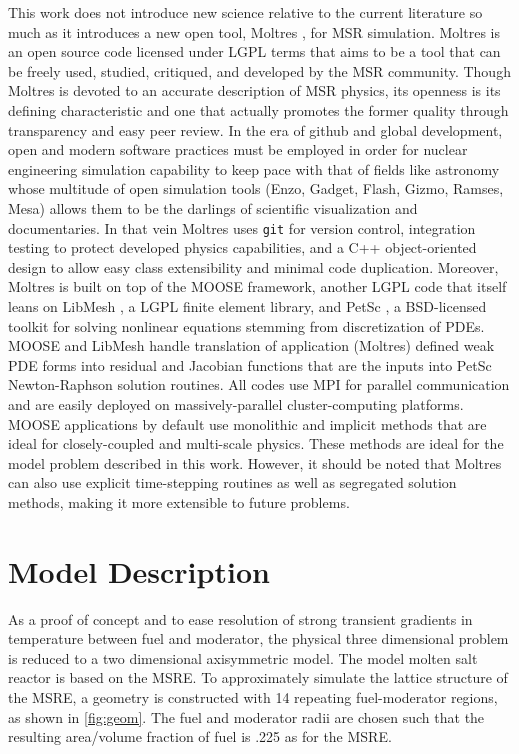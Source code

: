 \documentclass{article}
\let\Oldsection\section
\renewcommand{\section}{\FloatBarrier\Oldsection}
\begin{document}
This work does not introduce new science relative to the current literature so
much as it introduces a new open tool, Moltres
\cite{lindsay_arfc/moltres_nodate}, for \gls{MSR} simulation. Moltres is an
open source code licensed under \gls{LGPL} terms that aims to be a tool that can be
freely used, studied, critiqued, and developed by the \gls{MSR}
community. Though Moltres is devoted to an accurate description of \gls{MSR}
physics, its openness is its defining characteristic and one that actually
promotes the former quality through transparency and easy peer review. In the
era of github and global development, open and modern software practices must be
employed in order for nuclear engineering simulation capability to keep pace
with that of fields like astronomy whose multitude of open simulation tools
(Enzo, Gadget, Flash, Gizmo, Ramses, Mesa) allows them to be the darlings of
scientific visualization and documentaries. In that vein Moltres uses
\texttt{git} for version control, integration testing to protect
developed physics capabilities, and a C++ object-oriented design to allow easy
class extensibility and minimal code duplication. Moreover, Moltres is built on
top of the \gls{MOOSE} framework, \cite{gaston_physics-based_2015} another \gls{LGPL}
code that itself leans on LibMesh \cite{kirk2006libmesh}, a \gls{LGPL} finite element
library, and PetSc \cite{petsc-user-ref}, a \gls{BSD}-licensed toolkit for solving nonlinear
equations stemming from discretization of PDEs. \gls{MOOSE} and LibMesh handle
translation of application (Moltres) defined weak PDE forms into residual and
Jacobian functions that are the inputs into PetSc Newton-Raphson solution
routines. All codes use MPI for parallel communication and are easily deployed
on massively-parallel cluster-computing platforms. \gls{MOOSE} applications by default
use monolithic and implicit methods that are ideal for closely-coupled and
multi-scale physics. These methods are ideal for the model problem described in
this work. However, it should be noted that Moltres can also use explicit
time-stepping routines as well as segregated solution methods, making it more
extensible to future problems.

\section{Model Description}

As a proof of concept and to ease resolution of strong transient gradients in
temperature between fuel and moderator, the physical three dimensional problem
is reduced to a two dimensional axisymmetric model. The model molten salt
reactor is based on the \gls{MSRE}. To approximately simulate the lattice
structure of the \gls{MSRE}, a geometry is constructed with 14 repeating
fuel-moderator regions, as shown in \cref{fig:geom}. The fuel and moderator
radii are chosen such that the resulting area/volume fraction of fuel is .225 as
for the \gls{MSRE}.
\end{document}
